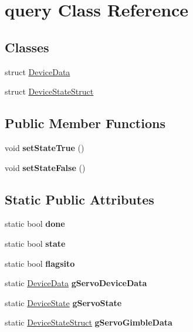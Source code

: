 \hypertarget{classquery}{}\section{query Class Reference}
\label{classquery}
\subsection*{Classes}
\begin{DoxyCompactItemize}
\item 
struct \hyperlink{structquery_1_1_device_data}{Device\+Data}
\item 
struct \hyperlink{structquery_1_1_device_state_struct}{Device\+State\+Struct}
\end{DoxyCompactItemize}
\subsection*{Public Member Functions}
\begin{DoxyCompactItemize}
\item 
\hypertarget{classquery_acf2bf652c64f735a477b711380559404}{}\label{classquery_acf2bf652c64f735a477b711380559404} 
void {\bfseries set\+State\+True} ()
\item 
\hypertarget{classquery_aaaa3bcd9a9813cc2ab0e1d4252388c0b}{}\label{classquery_aaaa3bcd9a9813cc2ab0e1d4252388c0b} 
void {\bfseries set\+State\+False} ()
\end{DoxyCompactItemize}
\subsection*{Static Public Attributes}
\begin{DoxyCompactItemize}
\item 
\hypertarget{classquery_a7d83d66032b4549a82029a9a41704529}{}\label{classquery_a7d83d66032b4549a82029a9a41704529} 
static bool {\bfseries done}
\item 
\hypertarget{classquery_ad2f745c620222666e40803eccafd337a}{}\label{classquery_ad2f745c620222666e40803eccafd337a} 
static bool {\bfseries state}
\item 
\hypertarget{classquery_a2c1e6167562e9201a541063fa4135ad2}{}\label{classquery_a2c1e6167562e9201a541063fa4135ad2} 
static bool {\bfseries flagsito}
\item 
\hypertarget{classquery_adaf502cafaf6fd1572616abbd877830b}{}\label{classquery_adaf502cafaf6fd1572616abbd877830b} 
static \hyperlink{structquery_1_1_device_data}{Device\+Data} {\bfseries g\+Servo\+Device\+Data}
\item 
\hypertarget{classquery_a06a5fb7c153647d6e24a797cf24d8631}{}\label{classquery_a06a5fb7c153647d6e24a797cf24d8631} 
static \hyperlink{struct_device_state}{Device\+State} {\bfseries g\+Servo\+State}
\item 
\hypertarget{classquery_a1a5c917d72e23c6b4b05325169c4734d}{}\label{classquery_a1a5c917d72e23c6b4b05325169c4734d} 
static \hyperlink{structquery_1_1_device_state_struct}{Device\+State\+Struct} {\bfseries g\+Servo\+Gimble\+Data}
\end{DoxyCompactItemize}
